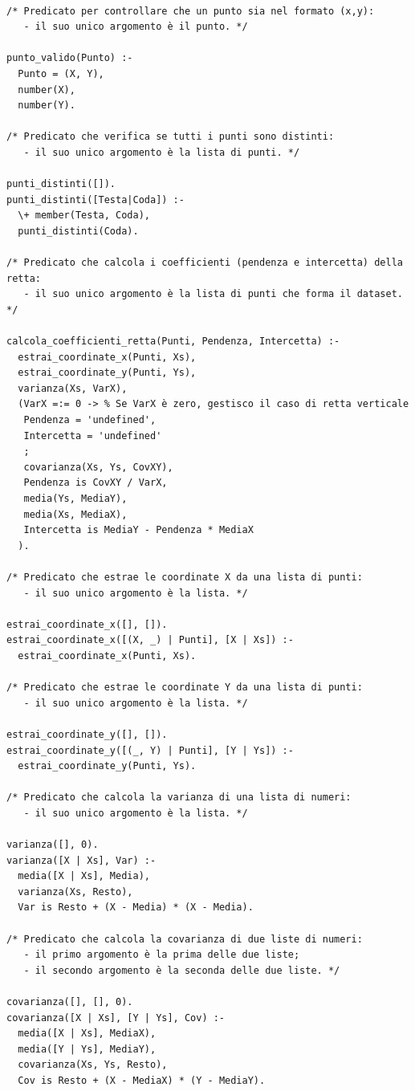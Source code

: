 \documentclass[11pt]{article}
\theoremstyle{definition}
\begin{document}
\begin{verbatim}
  
/* Predicato per controllare che un punto sia nel formato (x,y):
   - il suo unico argomento è il punto. */

punto_valido(Punto) :- 
  Punto = (X, Y),
  number(X),
  number(Y).
  
/* Predicato che verifica se tutti i punti sono distinti:
   - il suo unico argomento è la lista di punti. */

punti_distinti([]).
punti_distinti([Testa|Coda]) :- 
  \+ member(Testa, Coda),
  punti_distinti(Coda).

/* Predicato che calcola i coefficienti (pendenza e intercetta) della retta:
   - il suo unico argomento è la lista di punti che forma il dataset. */

calcola_coefficienti_retta(Punti, Pendenza, Intercetta) :-
  estrai_coordinate_x(Punti, Xs),
  estrai_coordinate_y(Punti, Ys),
  varianza(Xs, VarX),
  (VarX =:= 0 -> % Se VarX è zero, gestisco il caso di retta verticale
   Pendenza = 'undefined',
   Intercetta = 'undefined'
   ; 
   covarianza(Xs, Ys, CovXY),
   Pendenza is CovXY / VarX,
   media(Ys, MediaY),
   media(Xs, MediaX),
   Intercetta is MediaY - Pendenza * MediaX
  ).
 
/* Predicato che estrae le coordinate X da una lista di punti:
   - il suo unico argomento è la lista. */

estrai_coordinate_x([], []).
estrai_coordinate_x([(X, _) | Punti], [X | Xs]) :-
  estrai_coordinate_x(Punti, Xs).
  
/* Predicato che estrae le coordinate Y da una lista di punti:
   - il suo unico argomento è la lista. */

estrai_coordinate_y([], []).
estrai_coordinate_y([(_, Y) | Punti], [Y | Ys]) :-
  estrai_coordinate_y(Punti, Ys).

/* Predicato che calcola la varianza di una lista di numeri:
   - il suo unico argomento è la lista. */  

varianza([], 0).
varianza([X | Xs], Var) :-
  media([X | Xs], Media),
  varianza(Xs, Resto),
  Var is Resto + (X - Media) * (X - Media).
	
/* Predicato che calcola la covarianza di due liste di numeri:
   - il primo argomento è la prima delle due liste; 
   - il secondo argomento è la seconda delle due liste. */

covarianza([], [], 0).
covarianza([X | Xs], [Y | Ys], Cov) :-
  media([X | Xs], MediaX),
  media([Y | Ys], MediaY),
  covarianza(Xs, Ys, Resto),
  Cov is Resto + (X - MediaX) * (Y - MediaY).


\end{verbatim}
\end{document}
